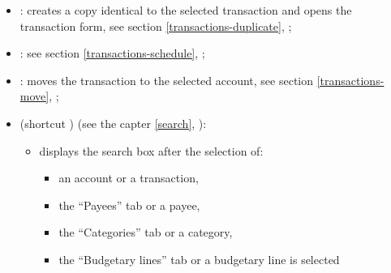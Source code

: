 \vspace{-6mm}
\begin{itemize}
	\item {}: creates a copy identical to the selected transaction and opens the transaction form, see section \vref{transactions-duplicate}, ;
	\item {}: see section \vref{transactions-schedule}, ;
	\item {}: moves the transaction to the selected account, see section \vref{transactions-move}, ;
	\item {} (shortcut ) (see the capter \vref{search}, ):
		\begin{itemize}
			\item displays the search box after the selection of:
				\begin{itemize}
					\item an account or a transaction,
					\item the \enquote{Payees} tab or a payee,
					\item the \enquote{Categories} tab or a category,
					\item the \enquote{Budgetary lines} tab or a budgetary line is selected

\end{itemize}
\end{itemize}
\end{itemize}
